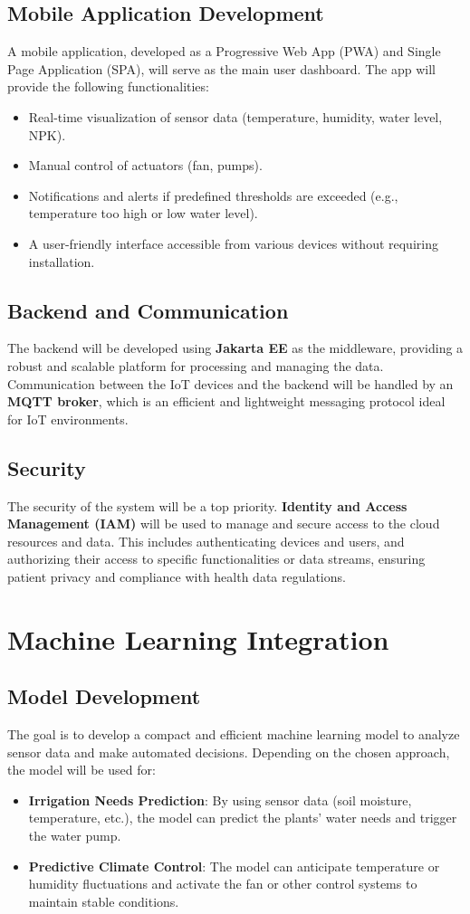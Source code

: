 \documentclass{report}
\begin{document}
\section{Mobile Application Development}
A mobile application, developed as a Progressive Web App (PWA) and Single Page Application (SPA), will serve as the main user dashboard. The app will provide the following functionalities:
\begin{itemize}
    \item Real-time visualization of sensor data (temperature, humidity, water level, NPK).
    \item Manual control of actuators (fan, pumps).
    \item Notifications and alerts if predefined thresholds are exceeded (e.g., temperature too high or low water level).
    \item A user-friendly interface accessible from various devices without requiring installation.
\end{itemize}

\section{Backend and Communication}
The backend will be developed using \textbf{Jakarta EE} as the middleware, providing a robust and scalable platform for processing and managing the data. Communication between the IoT devices and the backend will be handled by an \textbf{MQTT broker}, which is an efficient and lightweight messaging protocol ideal for IoT environments.

\section{Security}
The security of the system will be a top priority. \textbf{Identity and Access Management (IAM)} will be used to manage and secure access to the cloud resources and data. This includes authenticating devices and users, and authorizing their access to specific functionalities or data streams, ensuring patient privacy and compliance with health data regulations.

\chapter{Machine Learning Integration}
\section{Model Development}
The goal is to develop a compact and efficient machine learning model to analyze sensor data and make automated decisions. Depending on the chosen approach, the model will be used for:
\begin{itemize}
    \item \textbf{Irrigation Needs Prediction}: By using sensor data (soil moisture, temperature, etc.), the model can predict the plants' water needs and trigger the water pump.
    \item \textbf{Predictive Climate Control}: The model can anticipate temperature or humidity fluctuations and activate the fan or other control systems to maintain stable conditions.
\end{itemize}
\end{document}
